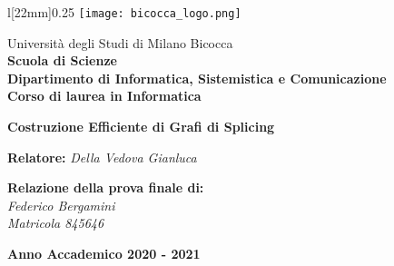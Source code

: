 \begin{titlepage}
\begin{onehalfspace}
	\begin{wrapfigure}[4]{l}[22mm]{0.25\textwidth}
		\vspace*{-7mm}
		\centering
		\texttt{[image: bicocca\_logo.png]}
	\end{wrapfigure}
	\par
	\noindent Università degli Studi di Milano Bicocca \\
	\textbf{Scuola di Scienze \\
			Dipartimento di Informatica, Sistemistica e Comunicazione \\
			Corso di laurea in Informatica}
\end{onehalfspace}

\vfill
\par

\begin{doublespace}
\begin{center}
	{\Huge \textbf{Costruzione Efficiente di Grafi di Splicing}}
\end{center}
\end{doublespace}

\vfill
\par

\begin{onehalfspace}
\begin{flushleft}
	{
	    \large \textbf{Relatore:} \textit{Della Vedova Gianluca} \\
	}
\end{flushleft}

\vspace{8mm}
\par

\begin{flushright}
	{\large \textbf{Relazione della prova finale di:} \\
			\textit{Federico Bergamini} \\
			\textit{Matricola 845646}}
\end{flushright}
\end{onehalfspace}

\vfill
\par

\begin{center}
	{\large \textbf{Anno Accademico 2020 - 2021}}
\end{center}

\end{titlepage}